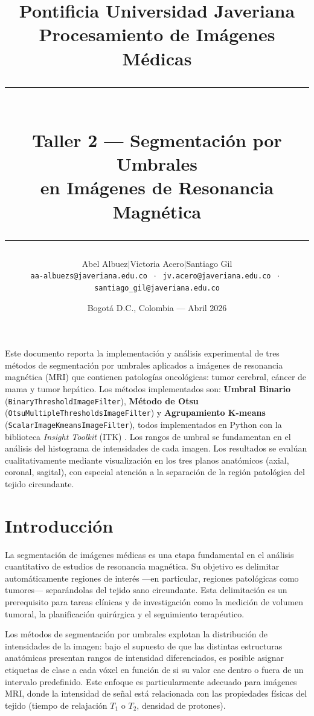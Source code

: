 \documentclass[12pt, a4paper]{article}
\title{
  \vspace{-1cm}
  {\large Pontificia Universidad Javeriana}\\[0.3em]
  {\large Procesamiento de Imágenes Médicas}\\[1em]
  \rule{\linewidth}{1.5pt}\\[0.5em]
  {\LARGE\bfseries Taller 2 — Segmentación por Umbrales\\[0.2em]
   en Imágenes de Resonancia Magnética}\\[0.3em]
  \rule{\linewidth}{1.5pt}
}
\author{
  Abel Albuez\quad$\mid$\quad Victoria Acero\quad$\mid$\quad Santiago Gil\\[0.4em]
  \small\texttt{aa-albuezs@javeriana.edu.co}
  $\;\cdot\;$
  \texttt{jv.acero@javeriana.edu.co}
  $\;\cdot\;$
  \texttt{santiago\_gil@javeriana.edu.co}
}
\date{Bogotá D.C., Colombia — Abril 2026}
\begin{document}

\maketitle
\thispagestyle{fancy}

\begin{tcolorbox}[infostyle, title={Resumen}]
Este documento reporta la implementación y análisis experimental de tres métodos de
segmentación por umbrales aplicados a imágenes de resonancia magnética (MRI) que
contienen patologías oncológicas: tumor cerebral, cáncer de mama y tumor hepático.
Los métodos implementados son: \textbf{Umbral Binario} (\texttt{BinaryThresholdImageFilter}),
\textbf{Método de Otsu} (\texttt{OtsuMultipleThresholdsImageFilter}) y \textbf{Agrupamiento
K-means} (\texttt{ScalarImageKmeansImageFilter}), todos implementados en Python con la
biblioteca \emph{Insight Toolkit} (ITK) \cite{itk}. Los rangos de umbral se fundamentan
en el análisis del histograma de intensidades de cada imagen. Los resultados se evalúan
cualitativamente mediante visualización en los tres planos anatómicos (axial, coronal,
sagital), con especial atención a la separación de la región patológica del tejido
circundante.
\end{tcolorbox}

\vspace{0.5em}
\tableofcontents
\newpage

\section{Introducción}

La segmentación de imágenes médicas es una etapa fundamental en el análisis cuantitativo
de estudios de resonancia magnética. Su objetivo es delimitar automáticamente regiones de
interés —en particular, regiones patológicas como tumores— separándolas del tejido sano
circundante. Esta delimitación es un prerequisito para tareas clínicas y de investigación
como la medición de volumen tumoral, la planificación quirúrgica y el seguimiento
terapéutico.

Los métodos de segmentación por umbrales explotan la distribución de intensidades de la
imagen: bajo el supuesto de que las distintas estructuras anatómicas presentan rangos de
intensidad diferenciados, es posible asignar etiquetas de clase a cada vóxel en función
de si su valor cae dentro o fuera de un intervalo predefinido. Este enfoque es
particularmente adecuado para imágenes MRI, donde la intensidad de señal está
relacionada con las propiedades físicas del tejido (tiempo de relajación $T_1$ o $T_2$,
densidad de protones).
\end{document}
